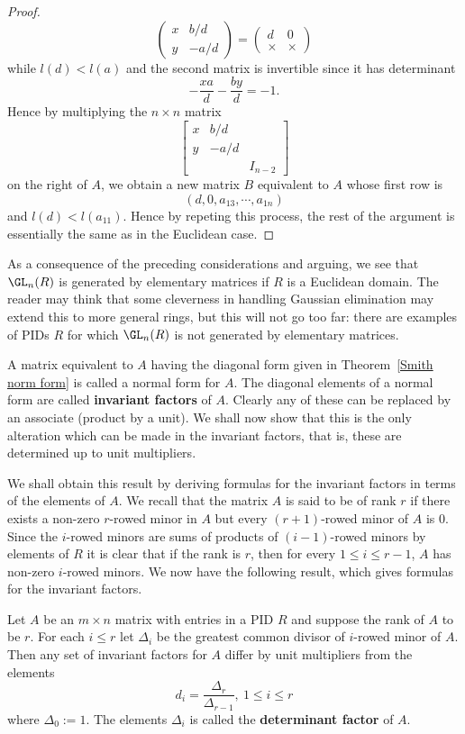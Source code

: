 \begin{proof}
\[\begin{pmatrix}
x&b/d\\
y&-a/d
\end{pmatrix}=\begin{pmatrix}
d&0\\
\times&\times
\end{pmatrix}\]
while $l(d)<l(a)$ and the second matrix is invertible since it has determinant 
\[-\frac{xa}{d}-\frac{by}{d}=-1.\]
Hence by multiplying the $n\times n$ matrix
\[\begin{bmatrix}
x&b/d&\\
y&-a/d&\\
&&I_{n-2}
\end{bmatrix}\]
on the right of $A$, we obtain a new matrix $B$ equivalent to $A$ whose first row is 
\[(d,0,a_{13},\cdots,a_{1n})\] 
and $l(d)<l(a_{11})$. Hence by repeting this process, the rest of the argument is essentially the same as in the Euclidean case.
\end{proof}
\begin{remark}
As a consequence of the preceding considerations and arguing, we see that $\GL_n(R)$ is generated by elementary matrices if $R$ is a Euclidean domain. The reader may think that some cleverness in handling Gaussian elimination may extend this to more general rings, but this will not go too far: there are examples of PIDs $R$ for which $\GL_n(R)$ is not generated by elementary matrices.
\end{remark}
A matrix equivalent to $A$ having the diagonal form given in Theorem~\ref{Smith norm form} is called a normal form for $A$. The diagonal elements of a normal form are called
\textbf{invariant factors} of $A$. Clearly any of these can be replaced by an associate
(product by a unit). We shall now show that this is the only alteration which can be made in the invariant factors, that is, these are determined up to unit multipliers.\par 
We shall obtain this result by deriving formulas for the invariant factors in terms of the elements of $A$. We recall that the matrix $A$ is said to be of rank $r$ if there exists a non-zero $r$-rowed minor in $A$ but every $(r+1)$-rowed minor of $A$ is $0$. Since the $i$-rowed minors are sums of products of $(i-1)$-rowed minors by elements of $R$ it is clear that if the rank is $r$, then for every $1\leq i\leq r-1$, $A$ has non-zero $i$-rowed minors. We now have the following result, which gives formulas for the invariant factors.
\begin{theorem}\label{det factor}
Let $A$ be an $m\times n$ matrix with entries in a PID $R$ and suppose the rank of $A$ to be $r$. For each $i\leq r$ let $\Delta_i$ be the greatest common divisor of $i$-rowed minor of $A$. Then any set of invariant factors for $A$ differ by unit multipliers from the elements
\[d_i=\frac{\Delta_r}{\Delta_{r-1}},\ 1\leq i\leq r\]
where $\Delta_0:=1$. The elements $\Delta_i$ is called the \textbf{determinant factor} of $A$.
\end{theorem}

